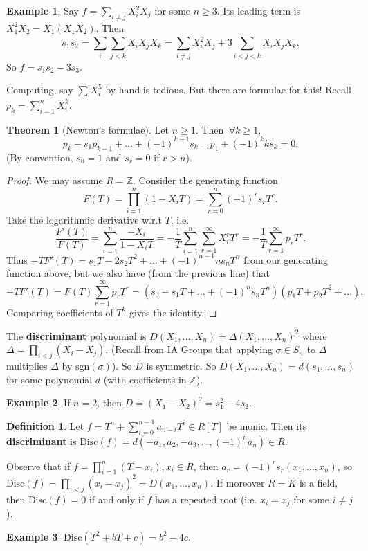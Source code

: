 \documentclass{article}
\theoremstyle{definition}
\newtheorem{theorem}{Theorem}[section]
\newtheorem{example}{Example}[section]
\newtheorem{defn}{Definition}[section]
\begin{document}
\begin{example}
    Say $f = \sum_{i \neq j} X_i^2 X_j$ for some $n \ge 3$. Its leading term is ${X_1^2X_2 = X_1(X_1X_2)}$. Then $$s_1s_2 = \sum_{i}^{} \sum_{j<k}^{} X_iX_jX_k = \sum_{i \neq j}^{} X_i^2 X_j + 3 \sum_{i<j<k}^{} X_iX_jX_k.$$ 
    So $f = s_1s_2 - 3s_3$.
\end{example}

Computing, say $\sum_{}^{} X_i^5$ by hand is tedious. But there are formulae for this! Recall $p_k = \sum_{i=1}^{n} X_i^k$.

\begin{theorem}[Newton's formulae]
    Let $n\ge 1$. Then $~\forall k \ge 1$, $$p_k - s_1p_{k-1} + \ldots + (-1)^{k-1}s_{k-1}p_1 + (-1)^k k s_k = 0.$$
    (By convention, $s_0 = 1$ and $s_r = 0$ if $r>n$).
\end{theorem}
\begin{proof}
    We may assume $R = \mathbb{Z}$. Consider the generating function \[
    F(T) = \prod_{i=1}^{n} (1-X_iT) = \sum_{r=0}^{n} (-1)^r s_r T^r.
    \]
    Take the logarithmic derivative w.r.t $T$, i.e. \[
    \frac{F'(T)}{F(T)} = \sum_{i=1}^{n} \frac{-X_i}{1-X_iT} = -\frac{1}{T} \sum_{i=1}^{n} \sum_{r=1}^{\infty} X_i^r T^r = -\frac{1}{T} \sum_{r=1}^{\infty} p_r T^r.
    \]
    Thus $-TF'(T) = s_1T - 2s_2T^2 + \ldots + (-1)^{n-1}ns_nT^n$ from our generating function above, but we also have (from the previous line) that $$-TF'(T) = F(T)\sum_{r=1}^{\infty} p_r T^r = (s_0 - s_1T + \ldots + (-1)^n s_n T^n)(p_1 T + p_2 T^2 + \ldots).$$
    Comparing coefficients of $T^k$ gives the identity. 
\end{proof}

The \textbf{discriminant} polynomial is $D(X_1,\ldots,X_n) = \Delta(X_1,\ldots,X_n)^2$ where $\Delta = \prod_{i<j} (X_i-X_j)$. (Recall from IA Groups that applying $\sigma \in S_n$ to $\Delta$ multiplies $\Delta$ by $\text{sgn}(\sigma)$). So $D$ is symmetric. So $D(X_1,\ldots,X_n) = d(s_1,\ldots,s_n)$ for some polynomial $d$ (with coefficients in $\mathbb{Z}$).
\begin{example}
    If $n=2$, then $D = (X_1 - X_2)^2 = s_1^2 - 4s_2$.
\end{example}
\begin{defn}
    Let $f =T^n + \sum_{i=0}^{n-1} a_{n-i}T^i \in R[T]$ be monic. Then its \textbf{discriminant} is $\text{Disc}(f) = d(-a_1,a_2,-a_3,\ldots,(-1)^n a_n) \in R$.
\end{defn}
Observe that if $f = \prod_{i=1}^{n} (T-x_i), x_i \in R$, then $a_r = (-1)^r s_r(x_1,\ldots,x_n)$, so $\text{Disc}(f) = \prod_{i<j}^{} (x_i-x_j)^2 = D(x_1,\ldots,x_n)$. If moreover $R = K$ is a field, then $\text{Disc}(f) = 0$ if and only if $f$ has a repeated root (i.e. $x_i=x_j$ for some $i \neq j$).
\begin{example}
    $\text{Disc}(T^2+bT+c) = b^2 - 4c$.
\end{example}
\end{document}
